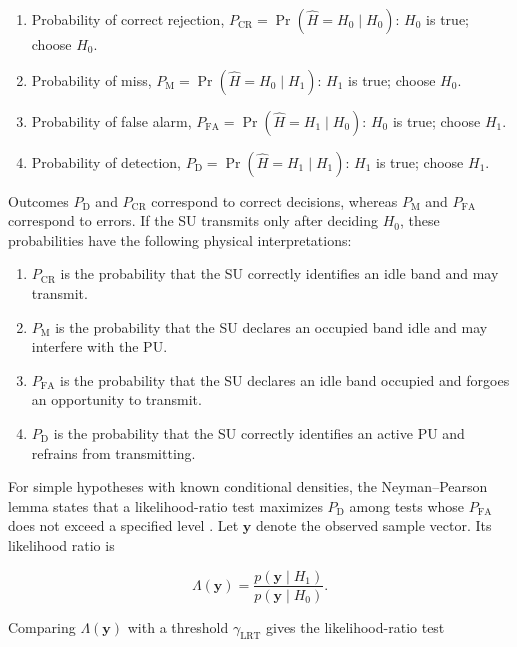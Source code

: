 \begin{enumerate}
\item\label{eq:Pcr} Probability of correct rejection, $P_{\mathrm{CR}}=\Pr(\widehat{H}=H_{0}\mid H_{0})$: $H_{0}$ is true; choose $H_{0}$.
\item\label{eq:Pm} Probability of miss, $P_{\mathrm{M}}=\Pr(\widehat{H}=H_{0}\mid H_{1})$: $H_{1}$ is true; choose $H_{0}$.
\item\label{eq:Pfa} Probability of false alarm, $P_{\mathrm{FA}}=\Pr(\widehat{H}=H_{1}\mid H_{0})$: $H_{0}$ is true; choose $H_{1}$.
\item\label{eq:Pd} Probability of detection, $P_{\mathrm{D}}=\Pr(\widehat{H}=H_{1}\mid H_{1})$: $H_{1}$ is true; choose $H_{1}$.
\end{enumerate}

Outcomes $P_{\mathrm{D}}$ and $P_{\mathrm{CR}}$ correspond to correct decisions, whereas $P_{\mathrm{M}}$ and $P_{\mathrm{FA}}$ correspond to errors.  If the SU transmits only after deciding $H_0$, these probabilities have the following physical interpretations:

\begin{enumerate}
\item $P_{\mathrm{CR}}$ is the probability that the SU correctly identifies an idle band and may transmit.
\item $P_{\mathrm{M}}$ is the probability that the SU declares an occupied band idle and may interfere with the PU.
\item $P_{\mathrm{FA}}$ is the probability that the SU declares an idle band occupied and forgoes an opportunity to transmit.
\item $P_{\mathrm{D}}$ is the probability that the SU correctly identifies an active PU and refrains from transmitting.
\end{enumerate}

For simple hypotheses with known conditional densities, the Neyman--Pearson lemma states that a likelihood-ratio test maximizes $P_{\mathrm{D}}$ among tests whose $P_{\mathrm{FA}}$ does not exceed a specified level \cite{liang-20,vantrees-01}.  Let $\mathbf{y}$ denote the observed sample vector.  Its likelihood ratio is

\begin{equation}\label{eq:lr}
\Lambda(\mathbf{y})=\frac{p(\mathbf{y}\mid H_{1})}{p(\mathbf{y}\mid H_{0})}.
\end{equation}

Comparing $\Lambda(\mathbf{y})$ with a threshold $\gamma_{\mathrm{LRT}}$ gives the likelihood-ratio test

